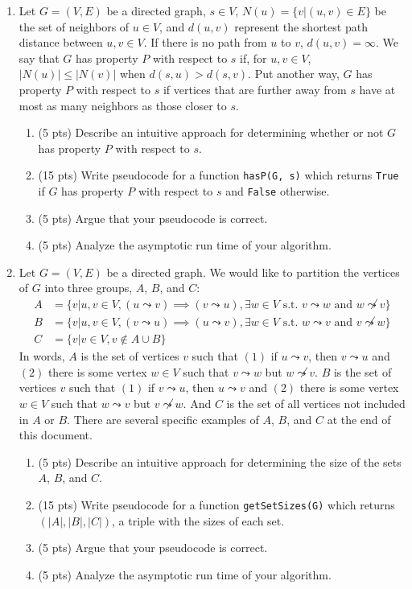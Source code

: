 \documentclass{article}
\begin{document}
\begin{enumerate}
    \item Let $G=(V,E)$ be a directed graph, $s \in V$, $N(u) = \{v | (u,v) \in E \}$ be the set of neighbors of $u \in V$, and $d(u,v)$ represent the shortest path distance between $u,v \in V$. If there is no path from $u$ to $v$, $d(u,v) = \infty$. We say that $G$ has property $P$ with respect to $s$ if, for $u,v \in V$, $|N(u)| \leq |N(v)|$ when $d(s,u) > d(s,v)$. Put another way, $G$ has property $P$ with respect to $s$ if vertices that are further away from $s$ have at most as many neighbors as those closer to $s$. %
    \begin{enumerate}
        \item (5 pts) Describe an intuitive approach for determining whether or not $G$ has property $P$ with respect to $s$.
        \item (15 pts) Write pseudocode for a function \verb|hasP(G, s)| which returns \verb|True| if $G$ has property $P$ with respect to $s$ and \verb|False| otherwise.
        \item (5 pts) Argue that your pseudocode is correct.
        \item (5 pts) Analyze the asymptotic run time of your algorithm.
    \end{enumerate}
    
    \item Let $G=(V,E)$ be a directed graph. We would like to partition the vertices of $G$ into three groups, $A$, $B$, and $C$:
    \begin{align*}
        A &= \{v | u,v\in V, (u \leadsto v) \implies (v \leadsto u), \exists w\in V \text{ s.t. } v \leadsto w \text{ and } w \not \leadsto v\} \\
        B &= \{v | u,v\in V, (v \leadsto u) \implies (u \leadsto v), \exists w\in V \text{ s.t. } w \leadsto v \text{ and } v \not \leadsto w\} \\
        C &= \{v | v \in V, v \not \in A \cup B\}
    \end{align*}
    In words, $A$ is the set of vertices $v$ such that $(1)$ if $u \leadsto v$, then $v \leadsto u$ and $(2)$ there is some vertex $w \in V$ such that $v \leadsto w$ but $w \not \leadsto v$. $B$ is the set of vertices $v$ such that $(1)$ if $v \leadsto u$, then $u \leadsto v$ and $(2)$ there is some vertex $w \in V$ such that $w \leadsto v$ but $v \not \leadsto w$. And $C$ is the set of all vertices not included in $A$ or $B$. There are several specific examples of $A$, $B$, and $C$ at the end of this document.
    \begin{enumerate}
        \item (5 pts) Describe an intuitive approach for determining the size of the sets $A$, $B$, and $C$.
        \item (15 pts) Write pseudocode for a function \verb|getSetSizes(G)| which returns $(|A|, |B|, |C|)$, a triple with the sizes of each set.
        \item (5 pts) Argue that your pseudocode is correct.
        \item (5 pts) Analyze the asymptotic run time of your algorithm.
    \end{enumerate}
\end{enumerate}
\end{document}
